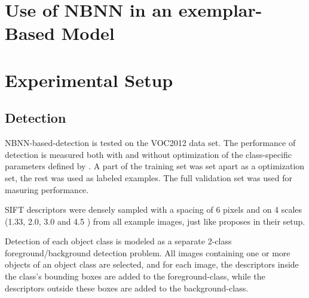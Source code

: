 \documentclass[a4paper,10pt]{article}
\begin{document}
\section{Use of NBNN in an exemplar-Based Model} %
\label{sec:linking}

\section{Experimental Setup} %
\label{sec:experimental_setup}

\subsection{Detection} %
\label{sub:detection}
NBNN-based-detection is tested on the VOC2012  data set. The performance of detection is measured both with and without optimization of the class-specific parameters defined by \cite{behmo2010towards}. A part of the training set was set apart as a optimization set, the rest was used as labeled examples. The full validation set was used for masuring performance.

SIFT descriptors were densely sampled with a spacing of 6 pixels and on 4 scales (1.33, 2.0, 3.0 and 4.5 ) from all example images, just like \cite{mccan2011local} proposes in their setup. 


Detection of each object class is modeled as a separate 2-class foreground/background detection problem. All images containing one or more objects of an object class are selected, and for each image, the descriptors inside the class's bounding boxes are added to the foreground-class, while the descriptors outside these boxes are added to the background-class.
\end{document}
